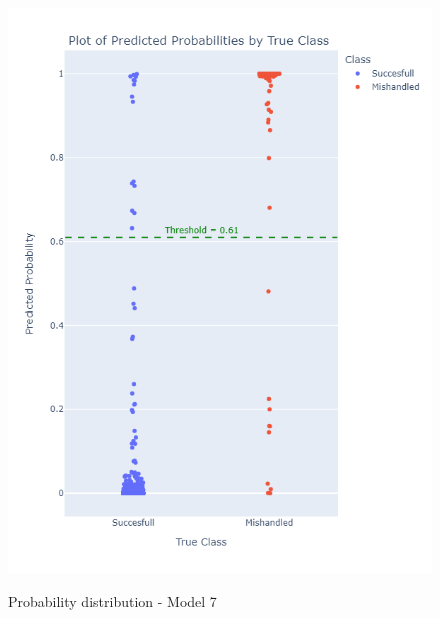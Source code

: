 \documentclass[12pt]{article}
\begin{document}
\begin{figure}
\begin{minipage}[c]{0.4\linewidth}
    \includegraphics[width=1\textwidth]{Probability_distribution_Model 7.png}\\
    \caption{Probability distribution - Model 7}
\end{minipage}
\hfill
\begin{minipage}[c]{0.4\linewidth}

\end{minipage}
\end{figure}
\end{document}
